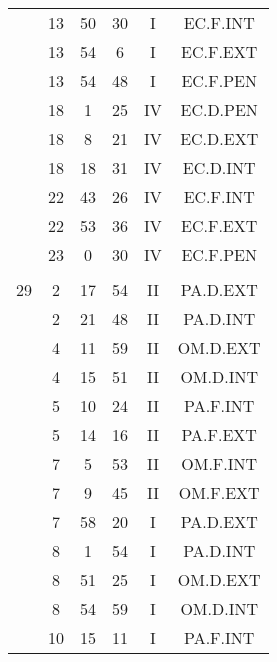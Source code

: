 \documentclass[12pt, a4paper]{article}
\begin{document}
\begin{multicols}{3}
{\begin{tabular}{c c c c c c}
	 	 	 	 & 13 & 50 & 30 & I & EC.F.INT\\%
	 	 	 	 & 13 & 54 & 6 & I & EC.F.EXT\\%
	 	 	 	 & 13 & 54 & 48 & I & EC.F.PEN\\%
	 	 	 	 & 18 & 1 & 25 & IV & EC.D.PEN\\%
	 	 	 	 & 18 & 8 & 21 & IV & EC.D.EXT\\%
	 	 	 	 & 18 & 18 & 31 & IV & EC.D.INT\\%
	 	 	 	 & 22 & 43 & 26 & IV & EC.F.INT\\%
	 	 	 	 & 22 & 53 & 36 & IV & EC.F.EXT\\%
	 	 	 	 & 23 & 0 & 30 & IV & EC.F.PEN\\%
	 	 	 	 & & & & & \\%
	 	 	 	29 & 2 & 17 & 54 & II & PA.D.EXT\\%
	 	 	 	 & 2 & 21 & 48 & II & PA.D.INT\\%
	 	 	 	 & 4 & 11 & 59 & II & OM.D.EXT\\%
	 	 	 	 & 4 & 15 & 51 & II & OM.D.INT\\%
	 	 	 	 & 5 & 10 & 24 & II & PA.F.INT\\%
	 	 	 	 & 5 & 14 & 16 & II & PA.F.EXT\\%
	 	 	 	 & 7 & 5 & 53 & II & OM.F.INT\\%
	 	 	 	 & 7 & 9 & 45 & II & OM.F.EXT\\%
	 	 	 	 & 7 & 58 & 20 & I & PA.D.EXT\\%
	 	 	 	 & 8 & 1 & 54 & I & PA.D.INT\\%
	 	 	 	 & 8 & 51 & 25 & I & OM.D.EXT\\%
	 	 	 	 & 8 & 54 & 59 & I & OM.D.INT\\%
	 	 	 	 & 10 & 15 & 11 & I & PA.F.INT\\%

\end{tabular}}
\end{multicols}
\end{document}
